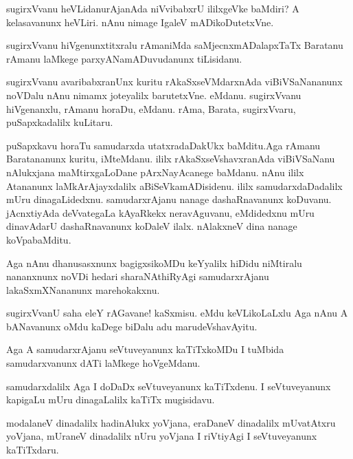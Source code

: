 \begin{mng}
sugirxVvanu heVLidanu\mdash rAjanAda niVvibabxrU ililxgeVke baMdiri? A kelasavanunx heVLiri. nAnu nimage IgaleV mADikoDutetxVne.
\end{mng}

\begin{mng}
sugirxVvanu hiVgenunxtitxralu rAmaniMda saMjecnxmADalapxTaTx Baratanu rAmanu laMkege parxyANamADuvudanunx tiLisidanu.
\end{mng}

\begin{mng}
sugirxVvanu avaribabxranUnx kuritu rAkaSxseVMdarxnAda viBiVSaNananunx noVDalu nAnu nimamx joteyalilx barutetxVne. eMdanu. sugirxVvanu hiVgenanxlu, rAmanu horaDu, eMdanu. rAma, Barata, sugirxVvaru, puSapxkadalilx kuLitaru.
\end{mng}

\begin{mng}
puSapxkavu horaTu samudarxda utatxradaDakUkx baMditu.Aga rAmanu Baratananunx kuritu, iMteMdanu. ililx rAkaSxseVshavxranAda viBiVSaNanu nAlukxjana maMtirxgaLoDane pArxNayAcanege baMdanu. nAnu ililx Atananunx laMkArAjayxdalilx aBiSeVkamADisidenu. ililx samudarxdaDadalilx mUru dinagaLidedxnu. samudarxrAjanu nanage dashaRnavanunx koDuvanu. jAcnxtiyAda deVvategaLa kAyaRkekx neravAguvanu, eMdidedxnu mUru dinavAdarU dashaRnavanunx koDaleV ilalx. nAlakxneV dina nanage koVpabaMditu.  
\end{mng}

\begin{mng}
Aga nAnu dhanusasxnunx bagigxsikoMDu keYyalilx hiDidu niMtiralu nananxnunx noVDi hedari sharaNAthiRyAgi samudarxrAjanu lakaSxmXNananunx marehokakxnu.
\end{mng}

\begin{mng}
sugirxVvanU saha eleY rAGavane! kaSxmisu. eMdu keVLikoLaLxlu Aga nAnu A bANavanunx oMdu kaDege biDalu adu marudeVshavAyitu.
\end{mng}

\begin{mng}
Aga A samudarxrAjanu seVtuveyanunx kaTiTxkoMDu I tuMbida samudarxvanunx dATi laMkege hoVgeMdanu.
\end{mng}

\begin{mng}
samudarxdalilx Aga I doDaDx seVtuveyanunx kaTiTxdenu. I seVtuveyanunx kapigaLu mUru dinagaLalilx kaTiTx mugisidavu.
\end{mng}

\begin{mng}
modalaneV dinadalilx hadinAlukx yoVjana, eraDaneV dinadalilx mUvatAtxru yoVjana, mUraneV dinadalilx nUru yoVjana I riVtiyAgi I seVtuveyanunx kaTiTxdaru.
\end{mng}

